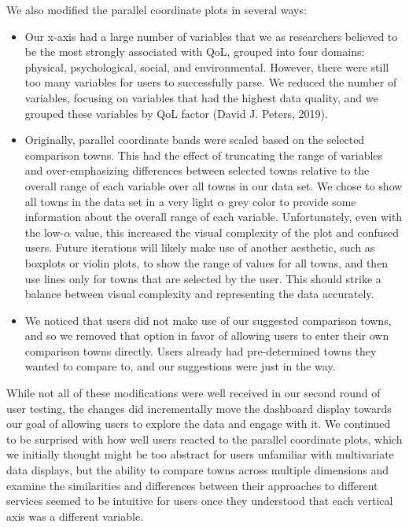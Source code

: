 \documentclass[print]{nuthesis}
\providecommand{\tightlist}{%
  \setlength{\itemsep}{0pt}\setlength{\parskip}{0pt}}
\begin{document}
We also modified the parallel coordinate plots in several ways:

\begin{itemize}
\tightlist
\item
  Our x-axis had a large number of variables that we as researchers believed to be the most strongly associated with QoL, grouped into four domains: physical, psychological, social, and environmental. However, there were still too many variables for users to successfully parse. We reduced the number of variables, focusing on variables that had the highest data quality, and we grouped these variables by QoL factor (David J. Peters, 2019).
\item
  Originally, parallel coordinate bands were scaled based on the selected comparison towns. This had the effect of truncating the range of variables and over-emphasizing differences between selected towns relative to the overall range of each variable over all towns in our data set. We chose to show all towns in the data set in a very light \(\alpha\) grey color to provide some information about the overall range of each variable. Unfortunately, even with the low-\(\alpha\) value, this increased the visual complexity of the plot and confused users. Future iterations will likely make use of another aesthetic, such as boxplots or violin plots, to show the range of values for all towns, and then use lines only for towns that are selected by the user. This should strike a balance between visual complexity and representing the data accurately.
\item
  We noticed that users did not make use of our suggested comparison towns, and so we removed that option in favor of allowing users to enter their own comparison towns directly. Users already had pre-determined towns they wanted to compare to, and our suggestions were just in the way.
\end{itemize}

While not all of these modifications were well received in our second round of user testing, the changes did incrementally move the dashboard display towards our goal of allowing users to explore the data and engage with it. We continued to be surprised with how well users reacted to the parallel coordinate plots, which we initially thought might be too abstract for users unfamiliar with multivariate data displays, but the ability to compare towns across multiple dimensions and examine the similarities and differences between their approaches to different services seemed to be intuitive for users once they understood that each vertical axis was a different variable.
\end{document}
